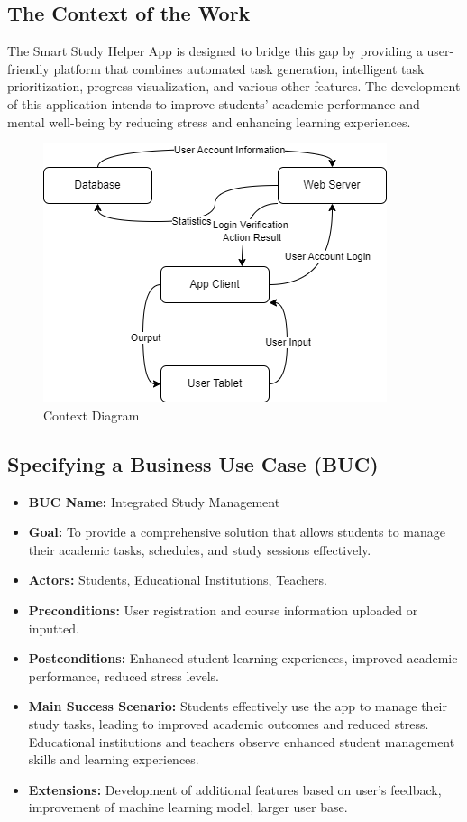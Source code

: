 \documentclass[12pt]{article}
\begin{document}
\subsection{The Context of the Work}
The Smart Study Helper App is designed to bridge this gap by providing a user-friendly platform that combines automated task generation, intelligent task prioritization, progress visualization, and various other features. The development of this application intends to improve students' academic performance and mental well-being by reducing stress and enhancing learning experiences.
\begin{figure}[htbp]
    \centering
    \includegraphics[width=0.7\linewidth]{Context Diagram.drawio.png} 
    \caption{Context Diagram}
\end{figure}

\subsection{Specifying a Business Use Case (BUC)}
\begin{itemize}
    \item \textbf{BUC Name:} Integrated Study Management
    \item \textbf{Goal:} To provide a comprehensive solution that allows students to manage their academic tasks, schedules, and study sessions effectively.
    \item \textbf{Actors:} Students, Educational Institutions, Teachers.
    \item \textbf{Preconditions:} User registration and course information uploaded or inputted.
    \item \textbf{Postconditions:} Enhanced student learning experiences, improved academic performance, reduced stress levels.
    \item \textbf{Main Success Scenario:} Students effectively use the app to manage their study tasks, leading to improved academic outcomes and reduced stress. Educational institutions and teachers observe enhanced student management skills and learning experiences.
    \item \textbf{Extensions:} Development of additional features based on user's feedback, improvement of machine learning model, larger user base.
\end{itemize}
\end{document}
